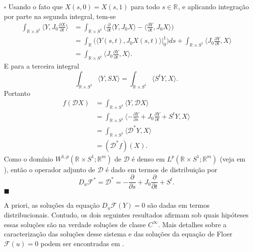 \documentclass[12pt]{book}
\newenvironment{prova}[1]{$\square$ #1}{\hfill$\blacksquare$}
\newcommand{\bigparenteses}[1]{\Big( #1 \Big) }
\newcommand{\circulo}{S^{1}}
\newcommand{\diferencialfloerponto}[1]{D_{#1}\operadorFloer}
\newcommand{\diferencialfloeradjponto}[1]{D_{#1}\operadorFloer^{*}}
\newcommand{\diferencialfloerabrev}{\mathcal{D}}
\newcommand{\derivadaparcial}[2]{\frac{\partial #1}{\partial #2}}
\newcommand{\espacoLpcontradominio}[2]{L^{p}(#1;#2)}
\newcommand{\espacosobolevcontradominio}[2]{W^{1,p}(#1;#2)}
\newcommand{\estruturacomplexa}{J_{0}}
\newcommand{\operadorFloer}{\mathcal{F}}
\newcommand{\operadorFloerParametro}[1]{\mathcal{F}(#1)}
\newcommand{\produtointerno}[2]{\langle #1, #2 \rangle}
\newcommand{\retacartesianocirculo}{\real{} \times \circulo}
\newcommand{\real}[1]{\mathbb{R}^{#1}}
\newcommand{\reta}{\real{}}
\begin{document}
\begin{prova}
		Usando o fato que $X(s, 0)=X(s, 1)$ para todo $s\in \reta$, e aplicando integração por parte na segunda integral, tem-se
		$$
		\begin{aligned}
		\int_{\retacartesianocirculo}\produtointerno{Y}{\estruturacomplexa\derivadaparcial{ X}{t}} 
		&= \int_{\retacartesianocirculo}\bigparenteses{\derivadaparcial{}{t}\produtointerno{Y}{ \estruturacomplexa X}-\produtointerno{\derivadaparcial{Y}{t} }{\estruturacomplexa X}}
		\\
		&= \int_{\reta}\bigparenteses{\produtointerno{Y(s,t)}{\estruturacomplexa X(s,t)}\Big|_{0}^{1}}ds + \int_{\retacartesianocirculo}\produtointerno{\estruturacomplexa \derivadaparcial{Y}{t}}{ X}
		\\
		&=\int_{\retacartesianocirculo}\produtointerno{\estruturacomplexa \derivadaparcial{Y}{t}}{ X}.
		\end{aligned}
		$$
		E para a terceira integral
		$$
		\int_{\retacartesianocirculo}\produtointerno{Y}{S X}= \int_{\retacartesianocirculo}\produtointerno{S^{t}Y}{ X}.
		$$
		Portanto
		$$
		\begin{aligned}
		f(\diferencialfloerabrev X)
		&= \int_{\retacartesianocirculo}\produtointerno{Y}{\diferencialfloerabrev X}
		\\
		&=
		\int_{\retacartesianocirculo}\produtointerno{-\derivadaparcial{Y}{s}+\estruturacomplexa \derivadaparcial{Y}{t} + S^{t}Y}{ X}
		\\
		&=\int_{\retacartesianocirculo}\produtointerno{\diferencialfloerabrev^{*}Y}{ X}
		\\
		&=(\diferencialfloerabrev^{*}f)(X).
		\end{aligned}
		$$
		Como o domínio $\espacosobolevcontradominio{\retacartesianocirculo}{\real{m}} $ de $\diferencialfloerabrev$ é denso em $\espacoLpcontradominio{\retacartesianocirculo}{\real{m}}$ (veja em \cite{breazis_sobolev_spaces}), então o operador adjunto de $\diferencialfloerabrev$ é dado em termos de distribuição por
		$$
		\diferencialfloeradjponto{u}=\diferencialfloerabrev^{*}=-\derivadaparcial{}{s}+\estruturacomplexa \derivadaparcial{}{t}+S^{t}.
		$$
	\end{prova}
	
	A priori, as soluções da equação $\diferencialfloerponto{u}(Y)=0$ são dadas em termos distribucionais. Contudo, os dois seguintes resultados afirmam sob quais hipóteses essas soluções são na verdade soluções de classe $C^{\infty}$. Mais detalhes sobre a caracterização das soluções desse sistema e das soluções da equação de Floer $\operadorFloerParametro{u}=0$ podem ser encontradas em \cite{audi_floer_homology}.
	
\end{document}
